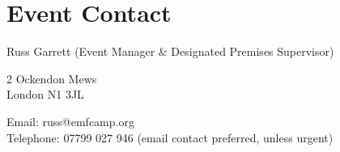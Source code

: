 \section{Event Contact}

Russ Garrett (Event Manager \& Designated Premises Supervisor)

2 Ockendon Mews \\
London N1 3JL

Email: russ@emfcamp.org \\
Telephone: 07799 027 946 (email contact preferred, unless urgent)

